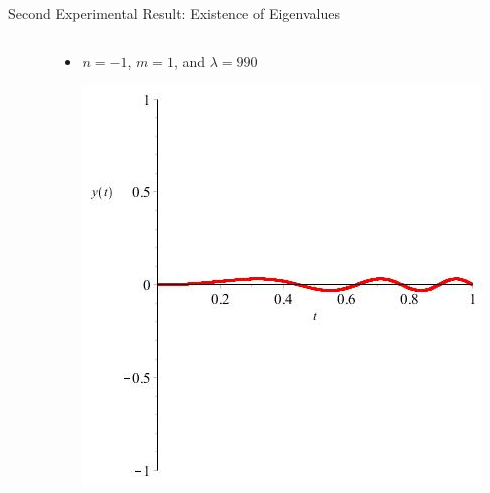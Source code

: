 \documentclass{beamer}
\begin{document}
\begin{frame}{Second Experimental Result: Existence of Eigenvalues}
\begin{columns}[T]
\begin{column}{35mm}
\begin{itemize}
\end{itemize}

\end{column}

\hspace*{-7mm}

\begin{column}{35mm}

\begin{itemize}

\item $n=-1$, $m=1$, and $\lambda=990$

\includegraphics[scale=0.2]{NEqualsNegative1MEquals1LambdaEquals990}

\end{itemize}

\end{column}

\end{columns}

\end{frame}
\end{document}
